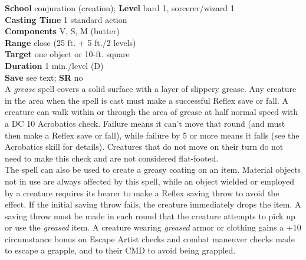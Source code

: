 \textbf{School }conjuration (creation); \textbf{Level }bard 1, sorcerer/wizard 1\\
\textbf{Casting Time }1 standard action\\
\textbf{Components }V, S, M (butter)\\
\textbf{Range }close (25 ft. + 5 ft./2 levels)\\
\textbf{Target }one object or 10-ft. square\\
\textbf{Duration }1 min./level (D)\\
\textbf{Save }see text; \textbf{SR }no\\
A \textit{grease }spell covers a solid surface with a layer of slippery grease. Any creature in the area when the spell is cast must make a successful Reflex save or fall. A creature can walk within or through the area of grease at half normal speed with a DC 10 Acrobatics check. Failure means it can't move that round (and must then make a Reflex save or fall), while failure by 5 or more means it falls (see the Acrobatics skill for details). Creatures that do not move on their turn do not need to make this check and are not considered flat-footed.\\
The spell can also be used to create a greasy coating on an item. Material objects not in use are always affected by this spell, while an object wielded or employed by a creature requires its bearer to make a Reflex saving throw to avoid the effect. If the initial saving throw fails, the creature immediately drops the item. A saving throw must be made in each round that the creature attempts to pick up or use the \textit{greased }item. A creature wearing \textit{greased }armor or clothing gains a +10 circumstance bonus on Escape Artist checks and combat maneuver checks made to escape a grapple, and to their CMD to avoid being grappled.\\
